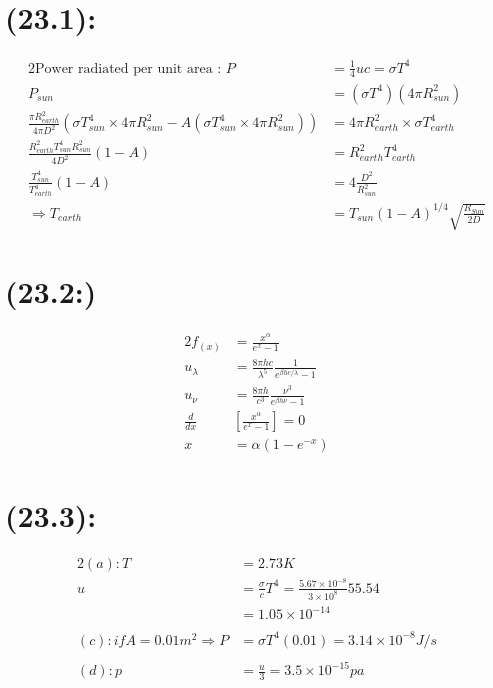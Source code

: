 \begin{latin}
    \section*{(23.1):}
    \begin{alignat*}{2}
        \text{Power radiated per unit area : } P &= \frac{1}{4}uc = \sigma T^4 \\
        P_{sun} &= (\sigma T^4)(4\pi R_{sun}^2)\\
        \frac{\pi R_{earth}^2}{4\pi D^2}(\sigma T_{sun}^4 \times 4\pi R_{sun}^2 - A(\sigma T_{sun}^4 \times 4\pi R_{sun}^2)) &= 4\pi R_{earth}^2 \times \sigma T_{earth}^4\\
        \frac{R_{earth}^2 T_{sun}^4 R_{sun}^2}{4D^2}(1-A) &= R_{earth}^2 T_{earth}^4 \\
        \frac{T_{sun}^4}{T_{earth}^4}(1-A) &= 4\frac{D^2}{R_{sun}^2}\\
        \Longrightarrow T_{earth} &=  T_{sun}(1-A)^{1/4} \sqrt{\frac{R_{Sun}}{2D}}
    \end{alignat*}

    \section*{(23.2:)}
    \begin{alignat*}{2}
        f_{(x)} &= \frac{x^{\alpha}}{e^x - 1}\\
        u_{\lambda}&= \frac{8\pi hc}{\lambda^5}\frac{1}{e^{\beta hc/\lambda}-1}\\
        u_{\nu} &=  \frac{8\pi h}{c^3}\frac{\nu^3}{e^{\beta h\nu}-1}\\
        \frac{d}{dx}&[ \frac{x^{\alpha}}{e^x - 1}] =0\\
        x &= \alpha(1 - e^{-x})
    \end{alignat*}

    \section*{(23.3):}
    \begin{alignat*}{2}
        (a):
        T &= 2.73K\\
        u &= \frac{\sigma}{c}T^4 = \frac{5.67 \times 10^{-8}}{3 \times 10^{8}}55.54\\
        &= 1.05 \times 10^{-14}\\\\
        (c):
        if A= 0.01m^2 \Rightarrow P &= \sigma T^4 (0.01) = 3.14 \times 10^{-8} J/s\\\\
        (d):
        p &= \frac{u}{3} =3.5 \times 10^{-15}pa
    \end{alignat*}
    

\end{latin}
